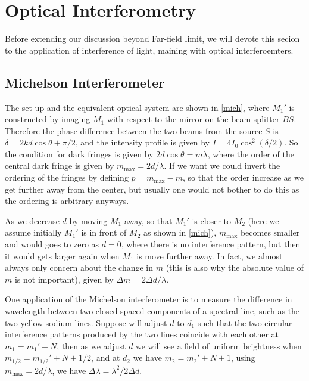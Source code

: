 \documentclass[english,a4paper,12pt]{report}
\begin{document}
\section{Optical Interferometry}

Before extending our discussion beyond Far-field limit, we will devote this secion to the application of interference of light, maining with optical interferoemters.

\subsection{Michelson Interferometer}

The set up and the equivalent optical system are shown in \cref{mich}, where \(M_1 '\) is constructed by imaging \(M_1 \) with respect to the mirror on the beam splitter \(BS\). Therefore the phase difference between the two beams from the source \(S\) is \(\delta  = 2kd \cos \theta + \pi /2\), and the intensity profile is given by \(I = 4I_0  \cos ^2( \delta /2)\). So the condition for dark fringes is given by \(2d \cos \theta = m\lambda \), where the order of the central dark fringe is given by \(m_{\text{max} }= 2d /\lambda \). If we want we could invert the ordering of the fringes by defining \(p = m_{\text{max} } - m \), so that the order increase as we get further away from the center, but usually one would not bother to do this as the ordering is arbitrary anyways. 

As we decrease \(d\) by moving \(M_1 \) away, so that \(M_1 '\) is closer to \(M_2 \) (here we assume initially \(M_1 '\) is in front of \(M_2 \) as shown in \cref{mich}), \(m_{\text{max} } \) becomes smaller and would goes to zero as \(d = 0\), where there is no interference pattern, but then it would gets larger again when \(M_1 \) is move further away. In fact, we almost always only concern about the change in \(m\) (this is also why the absolute value of \(m\) is not important), given by \(\Delta m = 2 \Delta d/\lambda \).

One application of the Michelson interferometer is to measure the difference in wavelength between two closed spaced components of a spectral line, such as the two yellow sodium lines. Suppose will adjust \(d\) to \(d_1 \) such that the two circular interference patterns produced by the two lines coincide with each other at \(m_1  = m_1 ' + N\), then as we adjust \(d\) we will see a field of uniform brightness when \(m_{1/2}   = m_{1/2}  ' + N + 1/2 \), and at \(d_2 \) we have \(m_2  = m_2 ' + N + 1\), using \(m_{\text{max} } = 2d /\lambda  \), we have \(\Delta \lambda = \lambda ^2 /2\Delta d\). 
\end{document}
